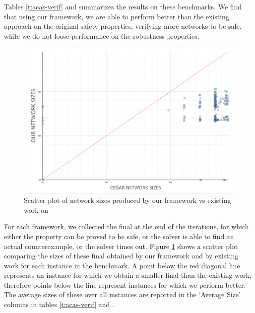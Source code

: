 Tables \ref{t:acas-verif} and \label{t:acas-verif-robustness} summarizes the
results on these benchmarks. We
find that using our framework, we are able to perform better than the existing
\cegar approach \cite{cegar-nn} on the original safety properties, verifying
more networks to be safe, while we do not loose performance on the robustness
properties. 

\begin{figure}
    \vspace*{-0.5cm}
    \includegraphics[scale=0.2]{figs/scatter-cegar-our-nerualsat-diag.png}
    \caption{Scatter plot of network sizes produced by our framework vs existing
    work \cite{cegar-nn} on \acasxu {}}
    \label{f:scatter-netsizes}
    \vspace*{-0.5cm}
\end{figure}

For each framework, we collected the final \abs at the end of the \cegar
iterations, for which either the property can be proved to be safe, or 
the solver is able to find an actual counterexample, or the solver times out.  
Figure \ref{f:scatter-netsizes} shows a scatter plot comparing the sizes of
these final \abs obtained by our framework and by existing work \cite{cegar-nn}
for each instance in the benchmark.
A point below the red diagonal line represents an instance for which we obtain a
smaller final \abs than the existing work, therefore points below the line
represent instances for which we perform better.
The average sizes of these \abs over all instances are
reported in the `Average Size' columns in tables \ref{t:acas-verif} and
\label{t:acas-verif-robustness}. 

